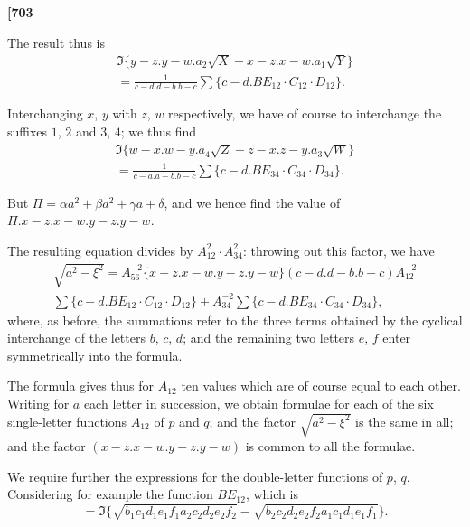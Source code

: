 \documentclass[12pt,a4paper]{article}
\theoremstyle{definition}
\begin{document}
\noindent\textbf{[703}

\vspace{0.5em}

The result thus is
\begin{multline*}
\Im\{y - z . y - w . a_2 \sqrt{X} - x - z . x - w . a_1 \sqrt{Y}\} \\
= \frac{1}{c - d . d - b . b - c} \sum\{c - d . BE_{12} \cdot C_{12} \cdot D_{12}\}.
\end{multline*}

Interchanging $x$, $y$ with $z$, $w$ respectively, we have of course to interchange the suffixes $1$, $2$ and $3$, $4$; we thus find
\begin{multline*}
\Im\{w - x . w - y . a_4 \sqrt{Z} - z - x . z - y . a_3 \sqrt{W}\} \\
= \frac{1}{c - a . a - b . b - c} \sum\{c - d . BE_{34} \cdot C_{34} \cdot D_{34}\}.
\end{multline*}

But $\Pi = \alpha a^2 + \beta a^2 + \gamma a + \delta$, and we hence find the value of $\Pi . x - z . x - w . y - z . y - w$.

The resulting equation divides by $A_{12}^2 \cdot A_{34}^2$: throwing out this factor, we have
\begin{multline*}
\sqrt{a^2 - \xi^2} = A_{56}^{-2} \{x - z . x - w . y - z . y - w\}(c - d . d - b . b - c) A_{12}^{-2} \\
\sum\{c - d . BE_{12} \cdot C_{12} \cdot D_{12}\} + A_{34}^{-2} \sum\{c - d . BE_{34} \cdot C_{34} \cdot D_{34}\},
\end{multline*}
where, as before, the summations refer to the three terms obtained by the cyclical interchange of the letters $b$, $c$, $d$; and the remaining two letters $e$, $f$ enter symmetrically into the formula.

The formula gives thus for $A_{12}$ ten values which are of course equal to each other. Writing for $a$ each letter in succession, we obtain formulae for each of the six single-letter functions $A_{12}$ of $p$ and $q$; and the factor $\sqrt{a^2 - \xi^2}$ is the same in all; and the factor $(x - z . x - w . y - z . y - w)$ is common to all the formulae.

We require further the expressions for the double-letter functions of $p$, $q$. Considering for example the function $BE_{12}$, which is
\[
= \Im\{\sqrt{b_1 c_1 d_1 e_1 f_1 a_2 c_2 d_2 e_2 f_2} - \sqrt{b_2 c_2 d_2 e_2 f_2 a_1 c_1 d_1 e_1 f_1}\}.
\]

\vspace{1em}
\end{document}
